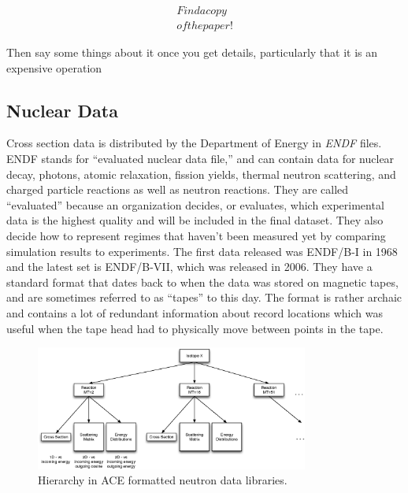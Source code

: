 \begin{equation}
\begin{split}
Find a copy\\
of the paper!
 \end{split}
\label{broaden_kernel}
\end{equation}

Then say some things about it once you get details, particularly that it is an expensive operation

\subsection{Nuclear Data}

Cross section data is distributed by the Department of Energy in \emph{ENDF} files.  ENDF stands for ``evaluated nuclear data file,'' and can contain data for nuclear decay, photons, atomic relaxation, fission yields, thermal neutron scattering, and charged particle reactions as well as neutron reactions.  They are called ``evaluated'' because an organization decides, or evaluates, which experimental data is the highest quality and will be included in the final dataset.  They also decide how to represent regimes that haven't been measured yet by comparing simulation results to experiments.   The first data released was ENDF/B-I in 1968 and the latest set is ENDF/B-VII, which was released in 2006.  They have a standard format that dates back to when the data was stored on magnetic tapes, and are sometimes referred to as ``tapes'' to this day.  The format is rather archaic and contains a lot of redundant information about record locations which was useful when the tape head had to physically move between points in the tape.  

\begin{figure}[h!]
  \centering
    \includegraphics[width=0.8\textwidth]{graphics/data_levels.eps}
     \caption{Hierarchy in ACE formatted neutron data libraries.  \label{data_levels}}
\end{figure}

